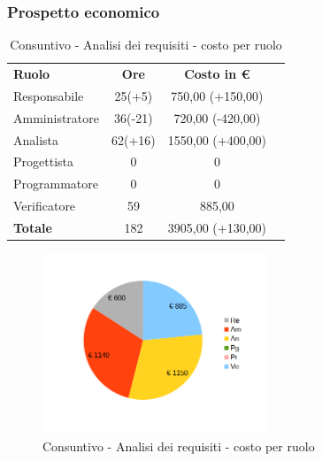 \newpage
\subsubsection{Prospetto economico}


\begin{table} [h!]
	\begin{center}
		\begin{tabular} { m{3 cm} c c c  }
			\rowcolor{lightgray}
			\textbf{Ruolo} & \textbf{Ore} & \textbf{Costo in \euro} \\
			Responsabile & 25(+5) & 750,00 (+150,00) \\
			Amministratore & 36(-21) & 720,00 (-420,00)  \\
			Analista & 62(+16) & 1550,00 (+400,00) \\
			Progettista & 0 & 0 \\
			Programmatore & 0 & 0  \\
			Verificatore & 59 & 885,00  \\
			\textbf{Totale} & 182  & 3905,00 (+130,00) \\
			
		\end{tabular}
		\caption{Consuntivo - Analisi dei requisiti - costo per ruolo}
	\end{center}
\end{table}

\begin{figure} [h!]
	\centering
	\includegraphics[width=0.6\textwidth]{res/img/grafici/consuntivo- torta_ costo_per_ora- analisi dei requisiti.png}
	\caption{Consuntivo - Analisi dei requisiti - costo per ruolo} 
\end{figure}

\newpage 

